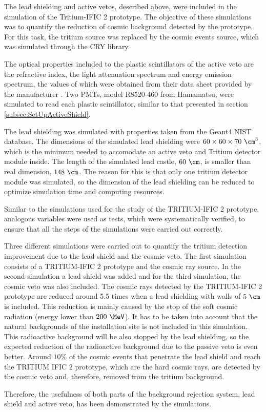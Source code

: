 The lead shielding and active vetos, described above, were included in the simulation of the Tritium-IFIC 2 prototype. The objective of these simulations was to quantify the reduction of cosmic background detected by the prototype. For this task, the tritium source was replaced by the cosmic events source, which was simulated through the CRY library.


The optical properties included to the plastic scintillators of the active veto are the refractive index, the light attenuation spectrum and energy emission spectrum, the values of which were obtained from their data sheet provided by the manufacturer \cite{ScintillatorVeto}. Two PMTs, model R8520-460 from Hamamatsu, were simulated to read each plastic scintillator, similar to that presented in section \ref{subsec:SetUpActiveShield}.

The lead shielding was simulated with properties taken from the Geant4 NIST database. The dimensions of the simulated lead shielding were $60 \times 60 \times 70~\cm^3$, which is the minimum needed to accomodate an active veto and Tritium detector module inside. The length of the simulated lead castle, $60~\cm$, is smaller than real dimension, $148~\cm$. The reason for this is that only one tritium detector module was simulated, so the dimension of the lead shielding can be reduced to optimize simulation time and computing resources.

Similar to the simulations used for the study of the TRITIUM-IFIC 2 prototype, analogous variables were used as tests, which were systematically verified, to ensure that all the steps of the simulations were carried out correctly.

Three different simulations were carried out to quantify the tritium detection improvement due to the lead shield and the cosmic veto. The first simulation consists of a TRITIUM-IFIC 2 prototype and the cosmic ray source. In the second simulation a lead shield was added and for the third simulation, the cosmic veto was also included. The cosmic rays detected by the TRITIUM-IFIC 2 prototype are reduced around 5.5 times when a lead shielding with walls of $5~\cm$ is included. This reduction is mainly caused by the stop of the soft cosmic radiation (energy lower than $200~\MeV$). It has to be taken into account that the natural backgrounds of the installation site is not included in this simulation. This radioactive background will be also stopped by the lead shielding, so the expected reduction of the radioactive background due to the passive veto is even better. Around $10\%$ of the cosmic events that penetrate the lead shield and reach the TRITIUM IFIC 2 prototype, which are the hard cosmic rays, are detected by the cosmic veto and, therefore, removed from the tritium background.

Therefore, the usefulness of both parts of the background rejection system, lead shield and active veto, has been demonstrated by the simulations.